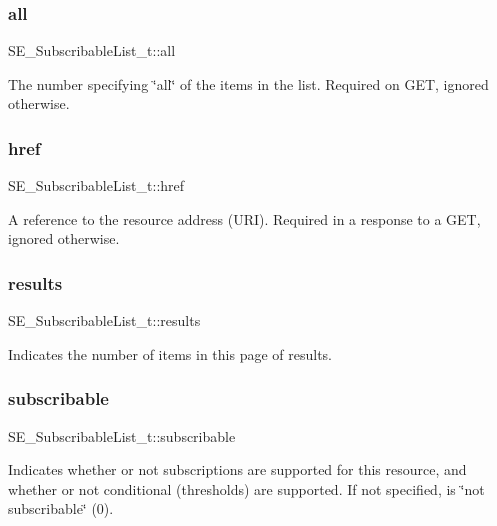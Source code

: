 \subsubsection{\texorpdfstring{all}{all}}
{\footnotesize\ttfamily S\+E\+\_\+\+Subscribable\+List\+\_\+t\+::all}

The number specifying \char`\"{}all\char`\"{} of the items in the list. Required on G\+ET, ignored otherwise. \mbox{\label{group__SubscribableList_gae6a8fd9999ba1d8525cd868cb088ea31}} 
\subsubsection{\texorpdfstring{href}{href}}
{\footnotesize\ttfamily S\+E\+\_\+\+Subscribable\+List\+\_\+t\+::href}

A reference to the resource address (U\+RI). Required in a response to a G\+ET, ignored otherwise. \mbox{\label{group__SubscribableList_ga188bf230efbba4b5cc5b73b8f2ee68b4}} 
\subsubsection{\texorpdfstring{results}{results}}
{\footnotesize\ttfamily S\+E\+\_\+\+Subscribable\+List\+\_\+t\+::results}

Indicates the number of items in this page of results. \mbox{\label{group__SubscribableList_ga3d4a74396a374cf43daaa4fde3f4d4ca}} 
\subsubsection{\texorpdfstring{subscribable}{subscribable}}
{\footnotesize\ttfamily S\+E\+\_\+\+Subscribable\+List\+\_\+t\+::subscribable}

Indicates whether or not subscriptions are supported for this resource, and whether or not conditional (thresholds) are supported. If not specified, is \char`\"{}not subscribable\char`\"{} (0). 